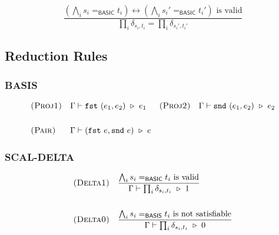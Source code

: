 $$
  \frac{(\bigwedge_i s_i =_\textsf{BASIC} t_i) \leftrightarrow (\bigwedge_i s_i' =_\textsf{BASIC} t_i') \textrm{ is valid}}{\prod_i \delta_{s_i, t_i} = \prod_i \delta_{s_i', t_i'}}
$$

\subsection{Reduction Rules}

\subsubsection*{\textsf{BASIS}}
\begin{align*}
    & \textsc{(Proj1)} && \Gamma \vdash \fst\ (e_1, e_2) \reduce e_1
    && \textsc{(Proj2)} && \Gamma \vdash \snd\ (e_1, e_2) \reduce e_2  \\
    \\
    & \textsc{(Pair)} && \Gamma \vdash (\fst\ e, \snd\ e)\reduce e
\end{align*}


\subsubsection*{\textsf{SCAL-DELTA}}
\begin{align*}
  & \textsc{(Delta1)} && 
  \frac{\bigwedge_i s_i =_\textsf{BASIC} t_i \textrm{ is valid}}{\Gamma \vdash \prod_i \delta_{s_i, t_i} \ \triangleright\  1}
  \\
  \\
  & \textsc{(Delta0)} && 
  \frac{\bigwedge_i s_i =_\textsf{BASIS} t_i \textrm{ is not satisfiable}}{\Gamma \vdash \prod_i \delta_{s_i, t_i} \ \triangleright\  0}
\end{align*}


